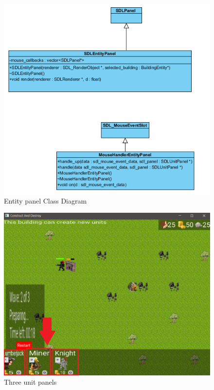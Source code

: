 \begin{figure}[!htb]
    \centering
    \includegraphics[scale=0.8]{res/entity-panel-class-diagram.png}
    \caption{Entity panel Class Diagram}\label{fig:entity-panel-class-diagram}
\end{figure}

\begin{figure}[!htb]
    \centering
    \includegraphics[scale=0.8]{res/unit-panel.png}
    \caption{Three unit panels}\label{fig:unit-panel}
\end{figure}

